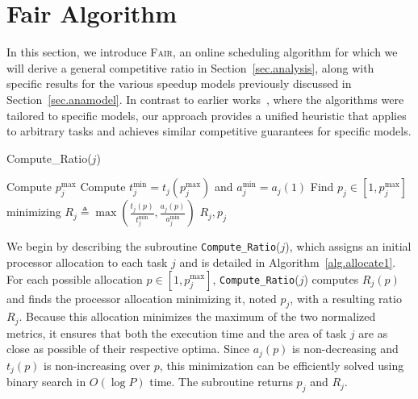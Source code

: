 \documentclass{article}
\newcommand\fair{\textsc{Fair}\xspace}
\newcommand\ratio{R\xspace}
\begin{document}
\section{Fair Algorithm}
\label{sec.alg}
In this section, we introduce \fair, an online scheduling algorithm for which we will derive a general competitive ratio in Section~\ref{sec.analysis}, along with specific results for the various speedup models previously discussed in Section~\ref{sec.anamodel}. In contrast to earlier works~\cite{ICPP22, TOPC24}, where the algorithms were tailored to specific models, our approach provides a unified heuristic that applies to arbitrary tasks and achieves similar competitive guarantees for specific models.

{
\begin{algorithm}[t]
    \footnotesize
	\caption{Compute\_Ratio($j$)}\label{alg.allocate1}
     
    \KwOut{Ratio $\ratio_j$ and processor allocation $p_j$} 
    Compute $p_j^{\max}$  
    Compute $t_j^{\min} = t_j(p_j^{\max})$ and $a_j^{\min} = a_j(1)$ 
    Find $p_j \in [1, p_j^{\max}]$ minimizing $\ratio_j \triangleq \max\left(\frac{t_j(p)}{t_j^{\min}}, \frac{a_j(p)}{a_j^{\min}}\right)$ 
    \Return $\ratio_j, p_j$
\end{algorithm}
}

We begin by describing the subroutine \texttt{Compute\_Ratio}($j$), which assigns an initial processor allocation to each task $j$ and is detailed in Algorithm~\ref{alg.allocate1}. For each possible allocation $p \in [1, p_j^{\max}]$, \texttt{Compute\_Ratio}($j$) computes  $\ratio_j(p)$ and finds the processor allocation minimizing it, noted $p_j$, with a resulting ratio $\ratio_j$. Because this allocation minimizes the maximum of the two normalized metrics, it ensures that both the execution time and the area of task $j$ are as close as possible of their respective optima. Since $a_j(p)$ is non-decreasing and $t_j(p)$ is non-increasing over $p$, this minimization can be efficiently solved using binary search in $O(\log P)$ time. The subroutine returns $p_j$ and $\ratio_j$.
\end{document}
